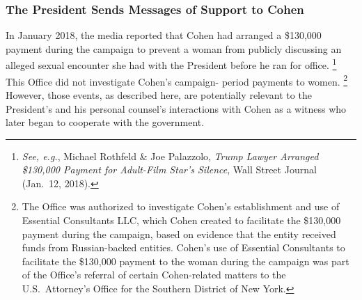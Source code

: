 \subsubsection{The President Sends Messages of Support to Cohen}

In January 2018, the media reported that Cohen had arranged a \$130,000 payment during the campaign to prevent a woman from publicly discussing an alleged sexual encounter she had with the President before he ran for office.%
\footnote{\textit{See, e.g.}, Michael Rothfeld \& Joe Palazzolo, \textit{Trump Lawyer Arranged \$130,000 Payment for Adult-Film Star's Silence}, Wall Street Journal (Jan.~12, 2018).}
This Office did not investigate Cohen's campaign- period payments to women.%
\footnote{The Office was authorized to investigate Cohen's establishment and use of Essential Consultants LLC, which Cohen created to facilitate the \$130,000 payment during the campaign, based on evidence that the entity received funds from Russian-backed entities.
Cohen's use of Essential Consultants to facilitate the \$130,000 payment to the woman during the campaign was part of the Office's referral of certain Cohen-related matters to the U.S.~Attorney's Office for the Southern District of New York.}
However, those events, as described here, are potentially relevant to the President's and his personal counsel's interactions with Cohen as a witness who later began to cooperate with the government.

